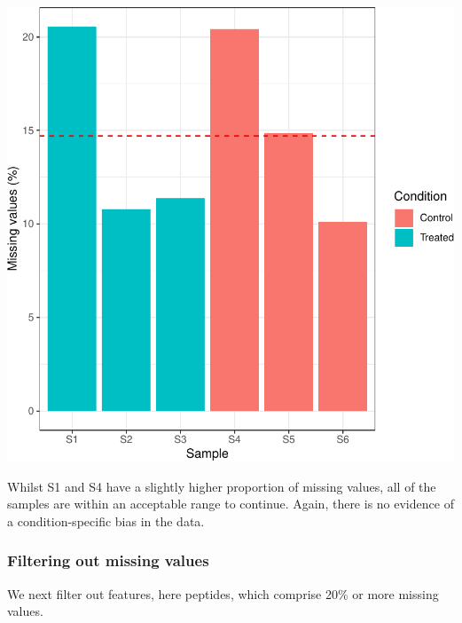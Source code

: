 \documentclass[9pt,a4paper,]{extarticle}
\newenvironment{Shaded}{\begin{snugshade}}{\end{snugshade}}
\newcommand{\DecValTok}[1]{\textcolor[rgb]{0.00,0.00,0.81}{#1}}
\newcommand{\DocumentationTok}[1]{\textcolor[rgb]{0.56,0.35,0.01}{\textbf{\textit{#1}}}}
\newcommand{\FunctionTok}[1]{\textcolor[rgb]{0.13,0.29,0.53}{\textbf{#1}}}
\newcommand{\NormalTok}[1]{#1}
\newcommand{\SpecialCharTok}[1]{\textcolor[rgb]{0.81,0.36,0.00}{\textbf{#1}}}
\newcommand{\StringTok}[1]{\textcolor[rgb]{0.31,0.60,0.02}{#1}}
\begin{document}
\begin{center}\includegraphics[height=0.4\textheight]{workflow_expressions_files/figure-latex/lfq_missing_data_2-1} \end{center}

Whilst S1 and S4 have a slightly higher proportion of missing values, all of the
samples are within an acceptable range to continue. Again, there is no evidence
of a condition-specific bias in the data.

\hypertarget{filtering-out-missing-values-1}{%
\subsubsection{Filtering out missing values}\label{filtering-out-missing-values-1}}

We next filter out features, here peptides, which comprise 20\% or more missing
values.

\begin{Shaded}
\end{Shaded}
\end{document}
